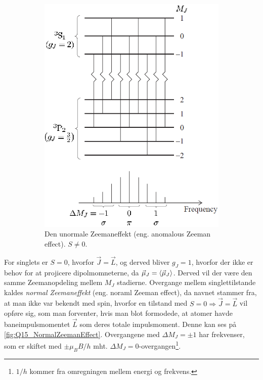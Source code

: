 \begin{figure}[!h]
\begin{subfigure}[t]{0.46\textwidth}
        \includegraphics[width=\columnwidth]{Q15/images/AnomalousZeemanEffect.PNG}
        \caption{Den unormale Zeemaneffekt (eng. anomalous Zeeman effect). $S \ne 0$.}
        \label{fig:Q15_AnomalousZeemanEffect}
    \end{subfigure}
    \caption{}
    \label{fig:Q15_TypesOfZeemanEffect}
\end{figure}

For singlets er $S = 0$, hvorfor $\Vec{J} = \Vec{L}$, og derved bliver $g_J = 1$, hvorfor der ikke er behov for at projicere dipolmomneterne, da $\Vec{\mu}_J = \Braket{\Vec{\mu}_J}$. Derved vil der være den samme Zeemanopdeling mellem $M_J$ stadierne. Overgange mellem singlettilstande kaldes \emph{normal Zeemaneffekt} (eng. noraml Zeeman effect), da navnet stammer fra, at man ikke var bekendt med spin, hvorfor en tilstand med $S = 0 \Rightarrow \Vec{J} = \Vec{L}$ vil opføre sig, som man forventer, hvis man blot formodede, at atomer havde baneimpulsmomentet $\Vec{L}$ som deres totale impulsmoment. Denne kan ses på \cref{fig:Q15_NormalZeemanEffect}. Overgangene med $\Delta M_J = \pm 1$ har frekvenser, som er skiftet med $\pm \mu_B B / h$ mht. $\Delta M_J = 0$-overgangen\footnote{$1/h$ kommer fra omregningen mellem energi og frekvens.}.

